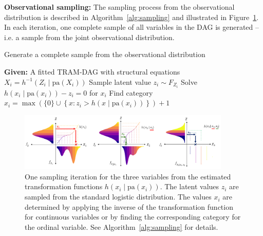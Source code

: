 \textbf{Observational sampling:} The sampling process from the observational distribution is described in Algorithm~\ref{alg:sampling} and illustrated in Figure~\ref{fig:sampling}. In each iteration, one complete sample of all variables in the DAG is generated -- i.e. a sample from the joint observational distribution.

\begin{algorithm}
\caption{Generate a complete sample from the observational distribution}
\label{alg:sampling}
\begin{algorithmic}
\State \textbf{Given:} A fitted TRAM-DAG with structural equations $X_i = h^{-1}(Z_i \mid \text{pa}(X_i))$
  \State Sample latent value $z_i \sim F_{Z_i}$ 
    \State Solve $h(x_i \mid \text{pa}(x_i)) - z_i = 0$ for $x_i$ 
    \State Find category $x_i = \max \left( \{0\} \cup \left\{ x : z_i > h(x \mid \text{pa}(x_i)) \right\} \right) + 1
$
  \EndIf
\EndFor
\end{algorithmic}
\end{algorithm}


\begin{figure}[H]
\centering
\includegraphics[width=0.9\textwidth]{img/sampling.png}
\caption{One sampling iteration for the three variables from the estimated transformation functions $h(x_i \mid \text{pa}(x_i))$. The latent values $z_i$ are sampled from the standard logistic distribution. The values $x_i$ are determined by applying the inverse of the transformation function for continuous variables or by finding the corresponding category for the ordinal variable. See Algorithm~\ref{alg:sampling} for details.}
\label{fig:sampling}
\end{figure}


% 


